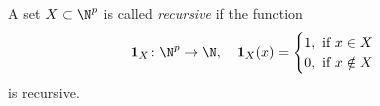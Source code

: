 \begin{dfn}
A set $X \subset \N^p$ is called \emph{recursive} if the function
\[
\mathbf{1}_X \colon \N^p \to \N, \quad \mathbf{1}_X(x) =
\begin{cases}
1, \text{ if }x \in X\\
0, \text{ if }x \notin X
\end{cases}
\]
is recursive.
\end{dfn}